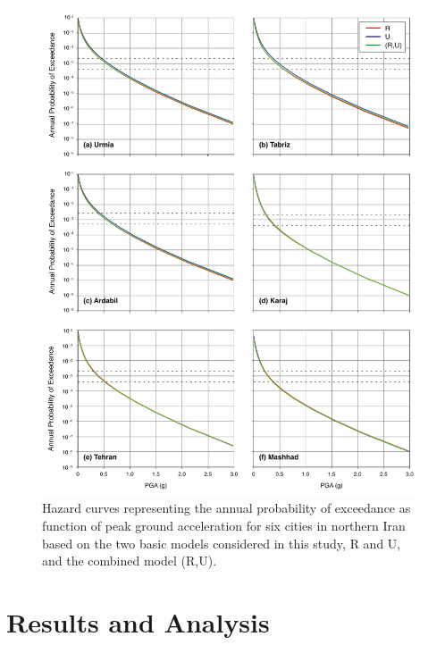 

\begin{figure}%
    \centering
    \includegraphics[width=\textwidth]{figures/pdf/figure-13}
    \caption{Hazard curves representing the annual probability of exceedance as function of peak ground acceleration for six cities in northern Iran based on the two basic models considered in this study, R and U, and the combined model (R,U). }
    \label{fig:hazardcurve}
\end{figure}

\section{Results and Analysis}

